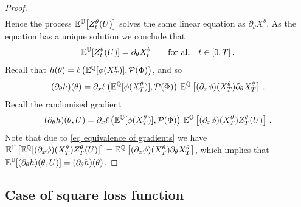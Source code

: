 \begin{proof}
\[\begin{split}
\end{split}
\]
Hence the process $\mathbb{E}^{\mathbb{U}} \big[Z_t^{\theta}(U)\big]$ solves the same linear equation as $\partial_\theta X^\theta$. 
As the equation has a unique solution we conclude that  
\begin{equation}\label{eq equivalence of gradients}
\mathbb{E}^{\mathbb{U}}[ Z_t^{\theta}(U) ] = \partial_\theta X_t^{\theta} \qquad \textup{for all} \quad t \in [0,T]\,.
\end{equation}
Recall that
$
h(\theta)= \ell\left(\mathbb{E}^{\mathbb{Q}}[\phi(X_T^{\theta})], \mathcal{P}(\Phi)\right)
$,
and so
\[
(\partial_\theta h)(\theta) = \partial_x \ell \left(\mathbb{E}^{\mathbb{Q}}[\phi(X_T^{\theta})] ,\mathcal{P}(\Phi)\right) \,\mathbb{E}^{ \mathbb{Q}}\left[(\partial_x\phi)( X_T^{\theta})\partial_\theta X_T^{\theta}\right]\,.
\]
Recall the randomised gradient 
\[
(\partial_\theta h)(\theta,U) =  \partial_x \ell  \left(\mathbb{E}^{\mathbb{Q}}[\phi(X_T^{\theta})] ,\mathcal{P}(\Phi)\right) \,\mathbb{E}^{ \mathbb{Q}}\left[(\partial_x\phi)( X_T^{\theta})Z_T^{\theta}(U) \right]\,.
\]
Note that due to \eqref{eq equivalence of gradients} we have $\mathbb{E}^{\mathbb{U}}\left[\mathbb{E}^{ \mathbb{Q}}[(\partial_x\phi)( X_T^{\theta})Z_T^{\theta}(U) ]\right] 
 =\mathbb{E}^{ \mathbb{Q}}\left[(\partial_x\phi)( X_T^{\theta})\partial_\theta X_T^{\theta}\right]$,
which implies that $\mathbb{E}^{\mathbb{U}}[(\partial_\theta h)(\theta,U)] = (\partial_\theta h)(\theta)$. 
\end{proof}


\subsection{Case of square loss function}\label{sec unbiased error}

